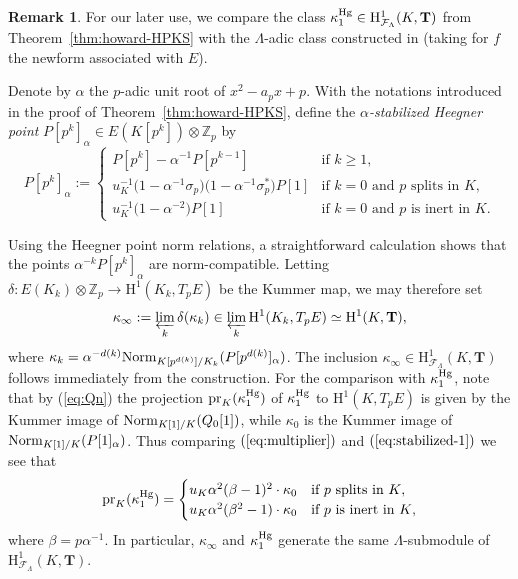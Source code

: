 \documentclass[10pt]{amsart}
\numberwithin{equation}{section}
\theoremstyle{definition}
\newtheorem{remark}[theorem]{Remark}
\theoremstyle{remark}
\newcommand{\Z}{\mathbb{Z}}
\newcommand{\Fcal}{\mathcal{F}}
\newcommand{\rH}{\mathrm{H}}
\begin{document}
\begin{remark}\label{rem:comparison}
For our later use, we compare the class $\kappa_1^{\rm Hg}\in\rH^1_{\Fcal_\Lambda}(K,\mathbf{T})$ from Theorem~\ref{thm:howard-HPKS} with the $\Lambda$-adic class constructed in \cite[\S{5.2}]{cas-hsieh1} (taking for $f$ the newform associated with $E$). 

Denote by $\alpha$ the $p$-adic unit root of $x^2-a_px+p$. With the notations introduced in the proof of Theorem~\ref{thm:howard-HPKS}, define the \emph{$\alpha$-stabilized Heegner point} $P[p^k]_\alpha\in E(K[p^k])\otimes\Z_p$ by 
\begin{equation}\label{eq:stabilized-1}
P[p^k]_\alpha:=\left\{
\begin{array}{ll}
P[p^k]-\alpha^{-1}P[p^{k-1}]&\textrm{if $k\geqslant 1$,}\\[0.2em]
u_K^{-1}\bigl(1-\alpha^{-1}\sigma_p\bigr)\bigl(1-\alpha^{-1}\sigma_p^*\bigr)P[1]&\textrm{if $k=0$ and $p$ splits in $K$,}\\
u_K^{-1}\bigl(1-\alpha^{-2}\bigr)P[1]&\textrm{if $k=0$ and $p$ is inert in $K$.}
\end{array}
\right.
\end{equation}

Using the Heegner point norm relations, a straightforward calculation shows that the points $\alpha^{-k}P[p^k]_\alpha$ are norm-compatible.  Letting $\delta:E(K_k)\otimes\Z_p\rightarrow\rH^1(K_k,T_pE)$ be the Kummer map, we may therefore set
\[
\kappa_\infty:=\varprojlim_k\delta(\kappa_k)\in\varprojlim_k\rH^1(K_k,T_pE)\simeq\rH^1(K,\mathbf{T}),
\]
where $\kappa_k=\alpha^{-d(k)}{\rm Norm}_{K[p^{d(k)}]/K_k}(P[p^{d(k)}]_\alpha)$. The inclusion $\kappa_\infty\in\rH^1_{\Fcal_\Lambda}(K,\mathbf{T})$ follows immediately from the construction. 
For the comparison with $\kappa_1^{\rm Hg}$, note that by (\ref{eq:Qn}) the projection ${\rm pr}_K({\kappa}_1^{\rm Hg})$ of $\kappa_1^{\rm Hg}$ to $\rH^1(K,T_pE)$ is given by the Kummer image of ${\rm Norm}_{K[1]/K}(Q_0[1])$, while $\kappa_0$ is the Kummer image of ${\rm Norm}_{K[1]/K}(P[1]_\alpha)$. Thus comparing $(\ref{eq:multiplier})$ and $(\ref{eq:stabilized-1})$ we see that 
\begin{equation}\label{eq:comparison}
{\rm pr}_K(\kappa_1^{\rm Hg})=
\begin{cases}
u_K\alpha^2(\beta-1)^2\cdot\kappa_0&\textrm{if $p$ splits in $K$},\\
u_K\alpha^2(\beta^2-1)\cdot\kappa_0&\textrm{if $p$ is inert in $K$,}
\end{cases}
\end{equation}
where $\beta=p\alpha^{-1}$. 
In particular, $\kappa_\infty$ and $\kappa_1^{\rm Hg}$ generate the same $\Lambda$-submodule of $\rH^1_{\Fcal_\Lambda}(K,\mathbf{T})$. 
\end{remark}
\end{document}
